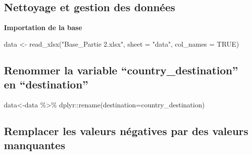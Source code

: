 \documentclass[
  14pt,
]{article}
\newenvironment{Shaded}{\begin{snugshade}}{\end{snugshade}}
\newcommand{\AttributeTok}[1]{\textcolor[rgb]{0.77,0.63,0.00}{#1}}
\newcommand{\ConstantTok}[1]{\textcolor[rgb]{0.00,0.00,0.00}{#1}}
\newcommand{\FunctionTok}[1]{\textcolor[rgb]{0.00,0.00,0.00}{#1}}
\newcommand{\NormalTok}[1]{#1}
\newcommand{\OtherTok}[1]{\textcolor[rgb]{0.56,0.35,0.01}{#1}}
\newcommand{\SpecialCharTok}[1]{\textcolor[rgb]{0.00,0.00,0.00}{#1}}
\newcommand{\StringTok}[1]{\textcolor[rgb]{0.31,0.60,0.02}{#1}}
\begin{document}
\hypertarget{nettoyage-et-gestion-des-donnuxe9es}{%
\subsection{\texorpdfstring{\textbf{Nettoyage et gestion des données}\\
}{Nettoyage et gestion des données }}\label{nettoyage-et-gestion-des-donnuxe9es}}

\textbf{Importation de la base}\\

\begin{Shaded}
\begin{Highlighting}[]
\NormalTok{data }\OtherTok{\textless{}{-}} \FunctionTok{read\_xlsx}\NormalTok{(}\StringTok{"Base\_Partie 2.xlsx"}\NormalTok{,}
                     \AttributeTok{sheet =} \StringTok{"data"}\NormalTok{,}
                     \AttributeTok{col\_names =} \ConstantTok{TRUE}\NormalTok{)}
\end{Highlighting}
\end{Shaded}

\hypertarget{renommer-la-variable-country_destination-en-destination}{%
\subsection{\texorpdfstring{\textbf{Renommer la variable
``country\_destination'' en ``destination''}\\
}{Renommer la variable ``country\_destination'' en ``destination'' }}\label{renommer-la-variable-country_destination-en-destination}}

\begin{Shaded}
\begin{Highlighting}[]
\NormalTok{data}\OtherTok{\textless{}{-}}\NormalTok{data }\SpecialCharTok{\%\textgreater{}\%} 
\NormalTok{  dplyr}\SpecialCharTok{::}\FunctionTok{rename}\NormalTok{(}\AttributeTok{destination=}\NormalTok{country\_destination)}
\end{Highlighting}
\end{Shaded}

\hypertarget{remplacer-les-valeurs-nuxe9gatives-par-des-valeurs-manquantes}{%
\subsection{\texorpdfstring{\textbf{Remplacer les valeurs négatives par
des valeurs manquantes}\\
}{Remplacer les valeurs négatives par des valeurs manquantes }}\label{remplacer-les-valeurs-nuxe9gatives-par-des-valeurs-manquantes}}
\end{document}
